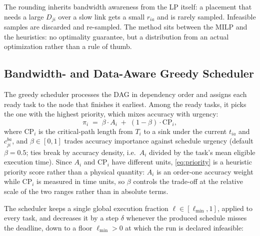 \documentclass[conference]{IEEEtran}
\begin{document}
The rounding inherits bandwidth awareness from the LP itself: a placement that needs a large $D_{ji}$ over a slow link gets a small $r_{ia}$ and is rarely sampled. Infeasible samples are discarded and re-sampled. The method sits between the MILP and the heuristics: no optimality guarantee, but a distribution from an actual optimization rather than a rule of thumb.

\subsection{Bandwidth- and Data-Aware Greedy Scheduler}
\label{sec:greedy}

The greedy scheduler processes the DAG in dependency order and assigns each ready task to the node that finishes it earliest. Among the ready tasks, it picks the one with the highest priority, which mixes accuracy with urgency:
\begin{equation}
\pi_i \;=\; \beta\cdot A_i \;+\; (1-\beta)\cdot \mathrm{CP}_i,
\label{eq:priority}
\end{equation}
where $\mathrm{CP}_i$ is the critical-path length from $T_i$ to a sink under the current $t_{ia}$ and $c_{ji}^{ba}$, and $\beta\in[0,1]$ trades accuracy importance against schedule urgency (default $\beta=0.5$; ties break by accuracy density, i.e.\ $A_i$ divided by the task's mean eligible execution time). Since $A_i$ and $\mathrm{CP}_i$ have different units, \eqref{eq:priority} is a heuristic priority score rather than a physical quantity: $A_i$ is an order-one accuracy weight while $\mathrm{CP}_i$ is measured in time units, so $\beta$ controls the trade-off at the relative scale of the two ranges rather than in absolute terms.

The scheduler keeps a single global execution fraction $\ell\in[\ell_{\min},1]$, applied to every task, and decreases it by a step $\delta$ whenever the produced schedule misses the deadline, down to a floor $\ell_{\min}>0$ at which the run is declared infeasible:
\end{document}
